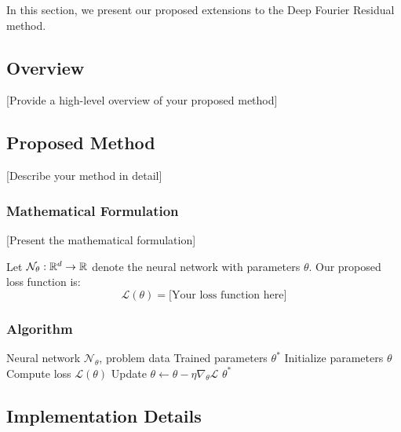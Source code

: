 
In this section, we present our proposed extensions to the Deep Fourier Residual method.

\subsection{Overview}

[Provide a high-level overview of your proposed method]

\subsection{Proposed Method}

[Describe your method in detail]

\subsubsection{Mathematical Formulation}

[Present the mathematical formulation]

Let $\mathcal{N}_\theta: \mathbb{R}^d \to \mathbb{R}$ denote the neural network with parameters $\theta$. Our proposed loss function is:
\begin{equation}
    \mathcal{L}(\theta) = \text{[Your loss function here]}
\end{equation}

\subsubsection{Algorithm}

\begin{algorithm}
\caption{[Your Algorithm Name]}
\label{alg:method}
\begin{algorithmic}[1]
\Require Neural network $\mathcal{N}_\theta$, problem data
\Ensure Trained parameters $\theta^*$
\State Initialize parameters $\theta$
    \State Compute loss $\mathcal{L}(\theta)$
    \State Update $\theta \gets \theta - \eta \nabla_\theta \mathcal{L}$
\EndFor
\State \Return $\theta^*$
\end{algorithmic}
\end{algorithm}

\subsection{Implementation Details}

